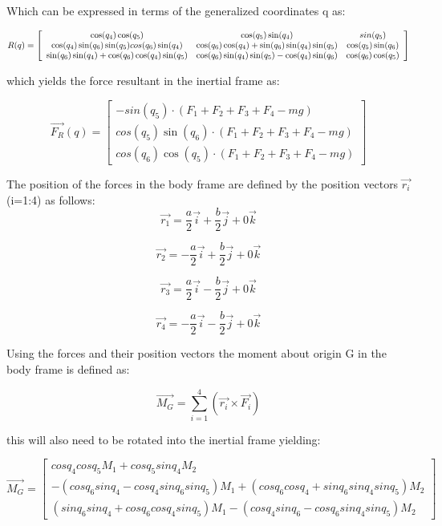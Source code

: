 \documentclass[10pt, letterpaper]{article}
\begin{document}
Which can be expressed in terms of the generalized coordinates q as:

\[
R(q)=\left[\begin{array}{ccc}
\cos(q_{4})\cos(q_{5}) & \cos(q_{5})\sin(q_{4}) & \-sin(q_{5})\\
\cos(q_{4})\sin(q_{6})\sin(q_{5})\-cos(q_{6})\sin(q_{4}) & \cos(q_{6})\cos(q_{4})+\sin(q_{6})\sin(q_{4})\sin(q_{5}) & \cos(q_{5})\sin(q_{6})\\
\sin(q_{6})\sin(q_{4})+\cos(q_{6})\cos(q_{4})\sin(q_{5}) & \cos(q_{6})\sin(q_{4})\sin(q_{5})-\cos(q_{4})\sin(q_{6}) & \cos(q_{6})\cos(q_{5})
\end{array}\right]
\]

which yields the force resultant in the inertial frame as:

\[
\overrightarrow{F_{R}}(q)=\left[\begin{array}{c}
-sin(q_{5})\cdot(F_{1}+F_{2}+F_{3}+F_{4}-mg)\\
cos(q_{5})\sin(q_{6})\cdot(F_{1}+F_{2}+F_{3}+F_{4}-mg)\\
cos(q_{6})\cos(q_{5})\cdot(F_{1}+F_{2}+F_{3}+F_{4}-mg)
\end{array}\right]
\]

The position of the forces in the body frame are defined by the position
vectors $\overrightarrow{r_{i}}$ (i=1:4) as follows:
\[
\overrightarrow{r_{1}}=\frac{a}{2}\overrightarrow{i}+\frac{b}{2}\overrightarrow{j}+0\overrightarrow{k}
\]

\[
\overrightarrow{r_{2}}=-\frac{a}{2}\overrightarrow{i}+\frac{b}{2}\overrightarrow{j}+0\overrightarrow{k}
\]

\[
\overrightarrow{r_{3}}=\frac{a}{2}\overrightarrow{i}-\frac{b}{2}\overrightarrow{j}+0\overrightarrow{k}
\]

\[
\overrightarrow{r_{4}}=-\frac{a}{2}\overrightarrow{i}-\frac{b}{2}\overrightarrow{j}+0\overrightarrow{k}
\]

Using the forces and their position vectors the moment about origin
G in the body frame is defined as:

\[
\overrightarrow{M_{G}}=\sum_{i=1}^{4}(\overrightarrow{r_{i}}\times\overrightarrow{F_{i}})
\]

this will also need to be rotated into the inertial frame yielding:

\[
\overrightarrow{M_{G}}=\left[\begin{array}{c}
cosq_{4}cosq_{5}M_{1}+cosq_{5}sinq_{4}M_{2}\\
-(cosq_{6}sinq_{4}-cosq_{4}sinq_{6}sinq_{5})M_{1}+(cosq_{6}cosq_{4}+sinq_{6}sinq_{4}sinq_{5})M_{2}\\
(sinq_{6}sinq_{4}+cosq_{6}cosq_{4}sinq_{5})M_{1}-(cosq_{4}sinq_{6}-cosq_{6}sinq_{4}sinq_{5})M_{2}
\end{array}\right]
\]
\end{document}

